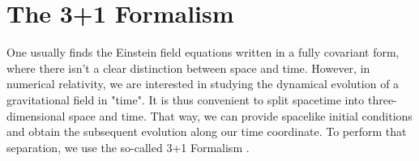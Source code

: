 


\section{The 3+1 Formalism}
\label{section:3+1_formalism}

One usually finds the Einstein field equations written in a fully covariant form, where there isn't a clear distinction between space and time. However, in numerical relativity, we are interested in studying the dynamical evolution of a gravitational field in "time". It is thus convenient to split spacetime into three-dimensional space and time. That way, we can provide spacelike initial conditions and obtain the subsequent evolution along our time coordinate. To perform that separation, we use the so-called 3+1 Formalism \cite{3+1_Formalism_and_Bases_of_Numerical_Relativity,Introduction_to_3+1_numerical_relativity,Numerical_Relativity_Solving_Einsteins_Equations_on_the_Computer}.

